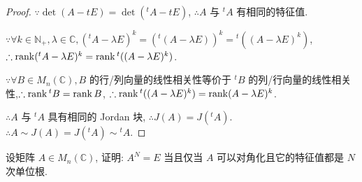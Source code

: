 \documentclass{ctexart}
\begin{document}
\begin{proof}
    $\because\det(A-tE)=\det({}^tA-tE)$, $\therefore A$ 与 $^tA$ 有相同的特征值.

    $\because\forall k\in\mathbb{N}_+,\lambda\in\mathbb{C},({}^tA-\lambda E)^k=({}^t(A-\lambda E))^k={}^t((A-\lambda E)^k)$, $\therefore\operatorname{rank} ({}^tA-\lambda E)^k=\operatorname{rank} {}^t((A-\lambda E)^k)$.
    
    $\because\forall B\in M_n(\mathbb{C}),B$ 的行/列向量的线性相关性等价于 $^tB$ 的列/行向量的线性相关性,$\therefore\operatorname{rank} {}^tB=\operatorname{rank} B$, $\therefore\operatorname{rank} {}^t((A-\lambda E)^k)=\operatorname{rank} (A-\lambda E)^k$.
    
    $\therefore A$ 与 $^tA$ 具有相同的 Jordan 块, $\therefore J(A)=J({}^tA)$. $\therefore A\sim J(A)=J({}^tA)\sim{}^tA$.
\end{proof}
\begin{exercise}%
    设矩阵 $A\in M_n(\mathbb{C})$, 证明: $A^N=E$ 当且仅当 $A$ 可以对角化且它的特征值都是 $N$ 次单位根.
\end{exercise}
\end{document}
